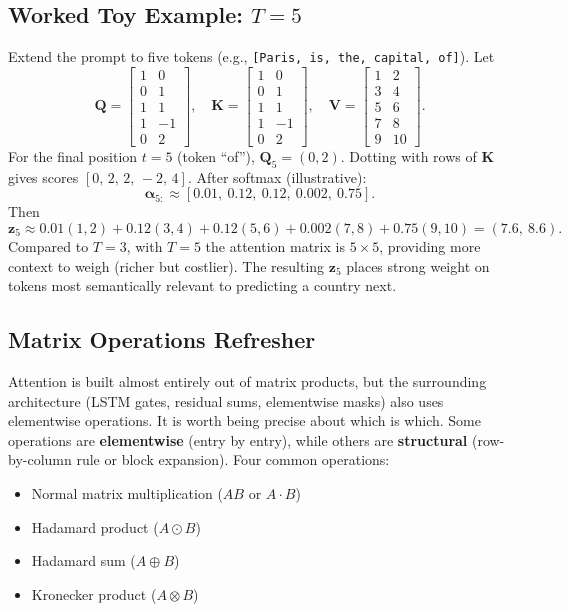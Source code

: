\documentclass[11pt]{article}
\theoremstyle{remark}
\begin{document}
\subsection{Worked Toy Example: \texorpdfstring{\(T=5\)}{T=5}}
Extend the prompt to five tokens (e.g., \texttt{[Paris, is, the, capital, of]}). Let
\[
\mathbf{Q}=
\begin{bmatrix}
1&0\\
0&1\\
1&1\\
1&-1\\
0&2
\end{bmatrix},\quad
\mathbf{K}=
\begin{bmatrix}
1&0\\
0&1\\
1&1\\
1&-1\\
0&2
\end{bmatrix},\quad
\mathbf{V}=
\begin{bmatrix}
1&2\\
3&4\\
5&6\\
7&8\\
9&10
\end{bmatrix}.
\]
For the final position \(t=5\) (token ``of''), \(\mathbf{Q}_5=(0,2)\). Dotting with rows of \(\mathbf{K}\) gives scores \([0,\,2,\,2,\,-2,\,4]\). After softmax (illustrative):
\[
\boldsymbol{\alpha}_{5:}\approx [0.01,\ 0.12,\ 0.12,\ 0.002,\ 0.75].
\]
Then
\[
\mathbf{z}_5 \approx 0.01(1,2)+0.12(3,4)+0.12(5,6)+0.002(7,8)+0.75(9,10)=(7.6,\ 8.6).
\]
Compared to \(T=3\), with \(T=5\) the attention matrix is \(5\times5\), providing more context to weigh (richer but costlier). The resulting \(\mathbf{z}_5\) places strong weight on tokens most semantically relevant to predicting a country next.

\subsection{Matrix Operations Refresher}

Attention is built almost entirely out of matrix products, but the surrounding architecture (LSTM gates, residual sums, elementwise masks) also uses elementwise operations. It is worth being precise about which is which. Some operations are \textbf{elementwise} (entry by entry), while others are \textbf{structural} (row-by-column rule or block expansion). Four common operations:
\begin{itemize}[noitemsep]
    \item Normal matrix multiplication (\(AB\) or \(A \cdot B\))
    \item Hadamard product (\(A \odot B\))
    \item Hadamard sum (\(A \oplus B\))
    \item Kronecker product (\(A \otimes B\))
\end{itemize}
\end{document}
